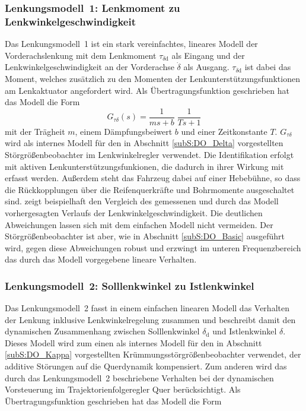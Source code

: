 \subsubsection{Lenkungsmodell~1: Lenkmoment zu Lenkwinkelgeschwindigkeit}
Das Lenkungsmodell~1 ist ein stark vereinfachtes, lineares Modell der Vorderachslenkung mit dem Lenkmoment $\tau_{\delta\mathrm{d}}$ als Eingang und der Lenkwinkelgeschwindigkeit an der Vorderachse $\dot\delta$ als Ausgang.
$\tau_{\delta\mathrm{d}}$ ist dabei das Moment, welches zusätzlich zu den Momenten der Lenkunterstützungsfunktionen am Lenkaktuator angefordert wird. Als Übertragungsfunktion geschrieben hat das Modell die Form
\begin{equation}
G_{\tau\delta}(s)=\frac{1}{ms+b}\;\frac{1}{Ts+1}\label{eq:GL1}
\end{equation}
mit der Trägheit $m$, einem Dämpfungsbeiwert $b$ und einer Zeitkonstante $T$.
$G_{\tau\delta}$ wird als internes Modell für den in Abschnitt \ref{subS:DO_Delta} vorgestellten Störgrößenbeobachter im Lenkwinkelregler verwendet. 
Die Identifikation erfolgt mit aktiven Lenkunterstützungsfunkionen, die dadurch in ihrer Wirkung mit erfasst werden. Außerdem steht das Fahrzeug dabei auf einer Hebebühne, so dass die Rückkopplungen über die Reifenquerkräfte und Bohrmomente ausgeschaltet sind.  zeigt beispielhaft den Vergleich des gemessenen und durch das Modell vorhergesagten Verlaufs der Lenkwinkelgeschwindigkeit. Die deutlichen Abweichungen lassen sich mit dem einfachen Modell nicht vermeiden. Der Störgrößenbeobachter ist aber, wie in Abschnitt \ref{subS:DO_Basic} ausgeführt wird, gegen diese Abweichungen robust und erzwingt im unteren Frequenzbereich das durch das Modell vorgegebene lineare Verhalten.




\subsubsection{Lenkungsmodell~2: Solllenkwinkel zu Istlenkwinkel}
Das Lenkungsmodell~2 fasst in einem einfachen linearen Modell das Verhalten der Lenkung inklusive Lenkwinkelregelung zusammen und beschreibt damit den dynamischen Zusammenhang zwischen Solllenkwinkel $\delta_\mathrm{d}$ und Istlenkwinkel $\delta$.
Dieses Modell wird zum einen als internes Modell für den in Abschnitt \ref{subS:DO_Kappa} vorgestellten Krümmungsstörgrößenbeobachter verwendet, der additive Störungen auf die Querdynamik kompensiert. Zum anderen wird das durch das Lenkungsmodell~2 beschriebene Verhalten bei der dynamischen Vorsteuerung im Trajektorienfolgeregler Quer berücksichtigt. Als Übertragungsfunktion geschrieben hat das Modell die Form


